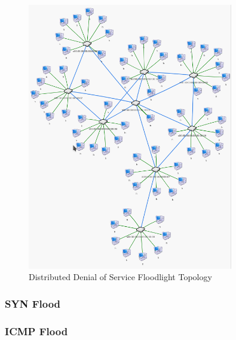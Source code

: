 \begin{figure}[H]
	\centering
	\includegraphics[width=0.8\textwidth]{images/flDDoS}
	\caption{Distributed Denial of Service Floodlight Topology}
	\label{fig:images-flDDoS}
\end{figure}

\subsubsection{SYN Flood}

\subsubsection{ICMP Flood}
